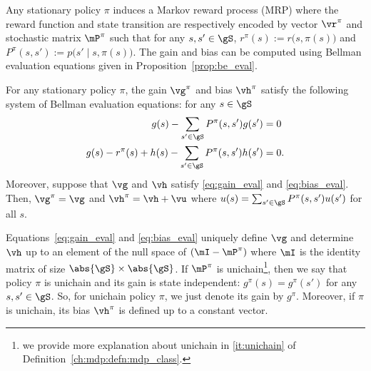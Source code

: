 Any stationary policy $\pi$ induces a Markov reward process (MRP) where the reward function and state transition are respectively encoded by vector $\vr^\pi$ and stochastic matrix $\mP^\pi$ such that for any $s,s'\in\gS$, $r^\pi(s):=r\big(s,\pi(s)\big)$ and $P^\pi(s,s'):=p\big(s'\mid s,\pi(s)\big)$.
The gain and bias can be computed using Bellman evaluation equations given in Proposition~\ref{prop:be_eval}.
\begin{prop}
    \label{prop:be_eval}
    For any stationary policy $\pi$, the gain $\vg^\pi$ and bias $\vh^\pi$ satisfy the following system of Bellman evaluation equations: for any $s\in\gS$
    \begin{align}
        g(s) -\sum_{s'\in\gS}P^\pi(s,s')g(s') &=0 \label{eq:gain_eval}\\
        g(s) -r^\pi(s) +h(s) -\sum_{s'\in\gS}P^\pi(s,s')h(s') &=0. \label{eq:bias_eval}
    \end{align}
    Moreover, suppose that $\vg$ and $\vh$ satisfy \eqref{eq:gain_eval} and \eqref{eq:bias_eval}. Then, $\vg^\pi=\vg$ and $\vh^\pi=\vh+\vu$ where $u(s)=\sum_{s'\in\gS}P^\pi(s,s')u(s')$ for all $s$.
\end{prop}
Equations~\eqref{eq:gain_eval} and \eqref{eq:bias_eval} uniquely define $\vg$ and determine $\vh$ up to an element of the null space of $(\mI-\mP^\pi)$ where $\mI$ is the identity matrix of size $\abs{\gS}\times\abs{\gS}$.
If $\mP^\pi$ is unichain\footnote{we provide more explanation about unichain in \ref{it:unichain} of Definition~\ref{ch:mdp:defn:mdp_class}.}, then we say that policy $\pi$ is unichain and its gain is state independent: $g^\pi(s)=g^\pi(s')$ for any $s,s'\in\gS$.
So, for unichain policy $\pi$, we just denote its gain by $g^\pi$.
Moreover, if $\pi$ is unichain, its bias $\vh^\pi$ is defined up to a constant vector.

